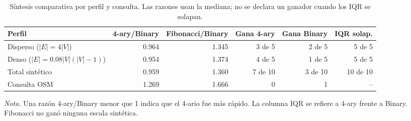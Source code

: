 \begin{table}[H]
\centering
\fontsize{8.5}{10.5}\selectfont
\renewcommand{\arraystretch}{1.15}
\setlength{\tabcolsep}{4pt}
\caption{Síntesis comparativa por perfil y consulta. Las razones usan la mediana; no se declara un ganador cuando los IQR se solapan.}
\label{tab:sintesis_colas}
\begin{tabular}{@{}lrrrrr@{}}
\toprule
\textbf{Perfil} & \textbf{4-ary/Binary} & \textbf{Fibonacci/Binary} & \textbf{Gana 4-ary} & \textbf{Gana Binary} & \textbf{IQR solap.} \\
\midrule
Disperso ($|E|=4|V|$) & 0.964 & 1.345 & 3 de 5 & 2 de 5 & 5 de 5 \\
Denso ($|E|=0.08|V|(|V|-1)$) & 0.954 & 1.374 & 4 de 5 & 1 de 5 & 5 de 5 \\
\midrule
Total sintético & 0.959 & 1.360 & 7 de 10 & 3 de 10 & 10 de 10 \\
Consulta OSM & 1.269 & 1.666 & 0 & 1 & -- \\
\bottomrule
\end{tabular}
\par\vspace{0.1cm}
\raggedright\fontsize{8}{10}\selectfont\textit{Nota.} Una razón 4-ary/Binary menor que 1 indica que el 4-ario fue más rápido. La columna IQR se refiere a 4-ary frente a Binary. Fibonacci no ganó ninguna escala sintética.
\end{table}
